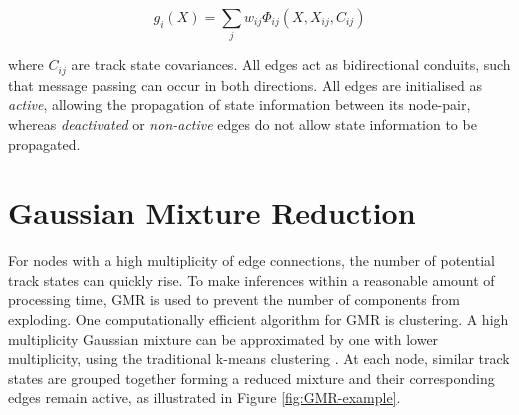 \begin{equation}
g_i(X) = \sum_{j} w_{ij}\Phi_{ij}(X, X_{ij}, C_{ij})
\label{eqn:gaussian-mixture}
\end{equation}

where $C_{ij}$ are track state covariances. All edges act as bidirectional conduits, such that message passing can occur in both directions. All edges are initialised as \textit{active}, allowing the propagation of state information between its node-pair, whereas \textit{deactivated} or \textit{non-active} edges do not allow state information to be propagated. 






\section{Gaussian Mixture Reduction}
\label{section-GMR}

For nodes with a high multiplicity of edge connections, the number of potential track states can quickly rise. To make inferences within a reasonable amount of processing time, GMR is used to prevent the number of components from exploding. One computationally efficient algorithm for GMR is clustering. A high multiplicity Gaussian mixture can be approximated by one with lower multiplicity, using the traditional k-means clustering \cite{kmeans}. At each node, similar track states are grouped together forming a reduced mixture and their corresponding edges remain active, as illustrated in Figure \ref{fig:GMR-example}. 


